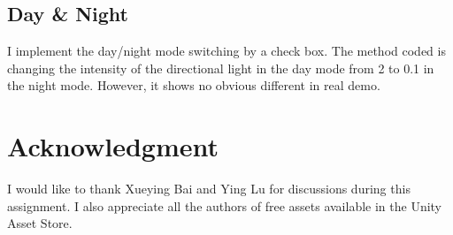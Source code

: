 \documentclass[11pt]{article}
\begin{document}
	\subsection{Day \& Night}
	I implement the day/night mode switching by a check box. The method coded is changing the intensity of the directional light in the day mode from 2 to 0.1 in the night mode. However, it shows no obvious different in real demo.
	
	
	
	
	
	\section{Acknowledgment}
	I would like to thank Xueying Bai and Ying Lu for discussions during this assignment. I also appreciate all the authors of free assets available in the Unity Asset Store.
	
	
\end{document}
